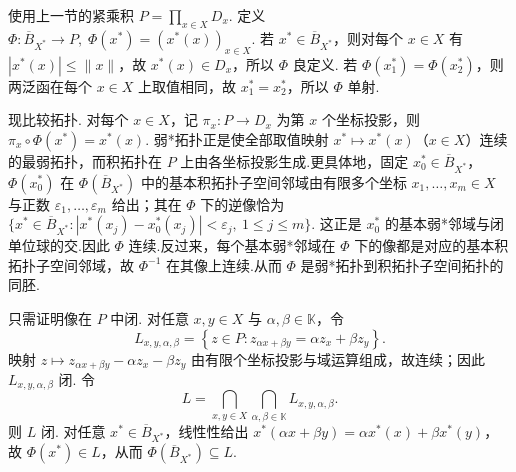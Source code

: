 \begin{FAProof}
使用上一节的紧乘积 \(\displaystyle P=\prod_{x\in X}D_x\). 定义
\(\displaystyle \Phi:\overline B_{X^*}\to P, \; \Phi(x^*)=(x^*(x))_{x\in X}\).
若 \(\displaystyle x^*\in\overline B_{X^*}\)，则对每个 \(\displaystyle x\in X\) 有 \(\displaystyle |x^*(x)|\leqslant\|x\|\)，故 \(\displaystyle x^*(x)\in D_x\)，所以 \(\displaystyle \Phi\) 良定义. 若 \(\displaystyle \Phi(x_1^*)=\Phi(x_2^*)\)，则两泛函在每个 \(\displaystyle x\in X\) 上取值相同，故 \(\displaystyle x_1^*=x_2^*\)，所以 \(\displaystyle \Phi\) 单射.

现比较拓扑. 对每个 \(\displaystyle x\in X\)，记 \(\displaystyle \pi_x:P\to D_x\) 为第 \(\displaystyle x\) 个坐标投影，则
\(\displaystyle \pi_x\circ\Phi(x^*)=x^*(x)\).
弱*拓扑正是使全部取值映射 \(\displaystyle x^*\mapsto x^*(x)\)（\(\displaystyle x\in X\)）连续的最弱拓扑，而积拓扑在 \(\displaystyle P\) 上由各坐标投影生成.更具体地，固定 \(\displaystyle x_0^*\in\overline B_{X^*}\)，\(\displaystyle \Phi(x_0^*)\) 在 \(\displaystyle \Phi(\overline B_{X^*})\) 中的基本积拓扑子空间邻域由有限多个坐标 \(\displaystyle x_1,\dots,x_m\in X\) 与正数 \(\displaystyle \varepsilon_1,\dots,\varepsilon_m\) 给出；其在 \(\displaystyle \Phi\) 下的逆像恰为
\(\displaystyle \bigl\{x^*\in\overline B_{X^*}: |x^*(x_j)-x_0^*(x_j)|<\varepsilon_j,\ 1\leqslant j\leqslant m\bigr\}\).
这正是 \(\displaystyle x_0^*\) 的基本弱*邻域与闭单位球的交.因此 \(\displaystyle \Phi\) 连续.反过来，每个基本弱*邻域在 \(\displaystyle \Phi\) 下的像都是对应的基本积拓扑子空间邻域，故 \(\displaystyle \Phi^{-1}\) 在其像上连续.从而 \(\displaystyle \Phi\) 是弱*拓扑到积拓扑子空间拓扑的同胚.

只需证明像在 \(\displaystyle P\) 中闭. 对任意 \(\displaystyle x,y\in X\) 与 \(\displaystyle \alpha,\beta\in\mathbb K\)，令
\[
L_{x,y,\alpha,\beta} = \left\{z\in P:z_{\alpha x+\beta y}=\alpha z_x+\beta z_y\right\}.
\]
映射 \(\displaystyle z\mapsto z_{\alpha x+\beta y}-\alpha z_x-\beta z_y\) 由有限个坐标投影与域运算组成，故连续；因此 \(\displaystyle L_{x,y,\alpha,\beta}\) 闭. 令
\[
L=
\bigcap_{x,y\in X}
\bigcap_{\alpha,\beta\in\mathbb K}
L_{x,y,\alpha,\beta}.
\]
则 \(\displaystyle L\) 闭. 对任意 \(\displaystyle x^*\in\overline B_{X^*}\)，线性性给出 \(\displaystyle x^*(\alpha x+\beta y)=\alpha x^*(x)+\beta x^*(y)\)，故 \(\displaystyle \Phi(x^*)\in L\)，从而 \(\displaystyle \Phi(\overline B_{X^*})\subseteq L\).


\end{FAProof}

